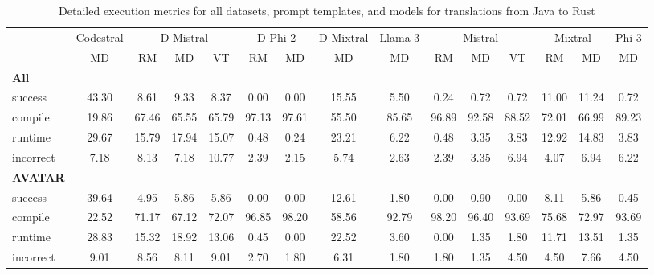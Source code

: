 \begin{table}[t]
\caption{Detailed execution metrics for all datasets, prompt templates, and models for translations from Java to Rust}
\label{tab:iteration_1_stats_percent_Java_Rust}

\setlength{\tabcolsep}{2.5pt} %
\renewcommand{\arraystretch}{1} %

\footnotesize
\begin{tabular}{@{}lcccccccccccccc@{}}
\toprule
 & Codestral & \multicolumn{3}{c}{D-Mistral} & \multicolumn{2}{c}{D-Phi-2} & D-Mixtral & Llama 3 & \multicolumn{3}{c}{Mistral}  & \multicolumn{2}{c}{Mixtral} & Phi-3 \\ 

\cmidrule(l){2-2}
\cmidrule(l){3-5}
\cmidrule(l){6-7}
\cmidrule(l){8-8}
\cmidrule(l){9-9}
\cmidrule(l){10-12}
\cmidrule(l){13-14}
\cmidrule(l){15-15}

& \multicolumn{1}{c}{MD}
& \multicolumn{1}{c}{RM}
& \multicolumn{1}{c}{MD}
& \multicolumn{1}{c}{VT}
& \multicolumn{1}{c}{RM}
& \multicolumn{1}{c}{MD} 
& \multicolumn{1}{c}{MD} 
& \multicolumn{1}{c}{MD} 
& \multicolumn{1}{c}{RM} 
& \multicolumn{1}{c}{MD} 
& \multicolumn{1}{c}{VT} 
& \multicolumn{1}{c}{RM}
& \multicolumn{1}{c}{MD} 
& \multicolumn{1}{c}{MD} \\

\midrule
\textbf{All} & & & & & & & & & & & & & & \\ 
\quad success & 43.30 & 8.61 & 9.33 & 8.37 & 0.00 & 0.00 & 15.55 & 5.50 & 0.24 & 0.72 & 0.72 & 11.00 & 11.24 & 0.72 \\
\qquad compile & 19.86 & 67.46 & 65.55 & 65.79 & 97.13 & 97.61 & 55.50 & 85.65 & 96.89 & 92.58 & 88.52 & 72.01 & 66.99 & 89.23 \\
\qquad runtime & 29.67 & 15.79 & 17.94 & 15.07 & 0.48 & 0.24 & 23.21 & 6.22 & 0.48 & 3.35 & 3.83 & 12.92 & 14.83 & 3.83 \\
\qquad incorrect & 7.18 & 8.13 & 7.18 & 10.77 & 2.39 & 2.15 & 5.74 & 2.63 & 2.39 & 3.35 & 6.94 & 4.07 & 6.94 & 6.22 \\
 

\textbf{AVATAR} & & & & & & & & & & & & & & \\
\quad success & 39.64 & 4.95 & 5.86 & 5.86 & 0.00 & 0.00 & 12.61 & 1.80 & 0.00 & 0.90 & 0.00 & 8.11 & 5.86 & 0.45 \\
\qquad compile & 22.52 & 71.17 & 67.12 & 72.07 & 96.85 & 98.20 & 58.56 & 92.79 & 98.20 & 96.40 & 93.69 & 75.68 & 72.97 & 93.69 \\
\qquad runtime & 28.83 & 15.32 & 18.92 & 13.06 & 0.45 & 0.00 & 22.52 & 3.60 & 0.00 & 1.35 & 1.80 & 11.71 & 13.51 & 1.35 \\
\qquad incorrect & 9.01 & 8.56 & 8.11 & 9.01 & 2.70 & 1.80 & 6.31 & 1.80 & 1.80 & 1.35 & 4.50 & 4.50 & 7.66 & 4.50 \\
 


\end{tabular}
\end{table}
